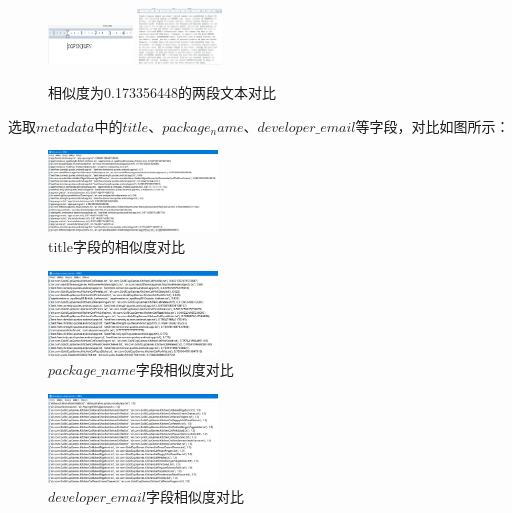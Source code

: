 \documentclass[UTF8,a4paper,10pt, twocolumn]{ctexart}
\begin{document}
\begin{figure}[htbp]
  \centering
  \includegraphics[width=0.2\textwidth]{img/fig3.png}
  \includegraphics[width=0.2\textwidth]{img/fig4.png}
  \caption{相似度为0.173356448的两段文本对比}
  \label{figure:zju2}
  \end{figure}

选取$metadata$中的$title$、$package_name$、$developer\_email$等字段，对比如图所示：

\begin{figure}[htbp]
  \centering
  \includegraphics[width=0.4\textwidth]{img/fig5.png}
  \caption{title字段的相似度对比}
  \label{figure:zju3}
  \end{figure}

\begin{figure}[htbp]
  \centering
  \includegraphics[width=0.4\textwidth]{img/fig6.png}
  \caption{$package\_name$字段相似度对比}
  \label{figure:zju4}
  \end{figure}

\begin{figure}[htbp]
  \centering
  \includegraphics[width=0.4\textwidth]{img/fig7.png}
  \caption{$developer\_email$字段相似度对比}
  \label{figure:zju5}
  \end{figure}
\end{document}
